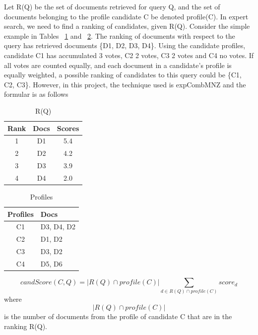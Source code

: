 Let R(Q) be the set of documents retrieved for query Q, and the set of documents belonging to the profile candidate C be denoted profile(C). In expert
search, we need to find a ranking of candidates, given R(Q). Consider the simple example in Tables ~\ref{table:ranking} and ~\ref{table:profiles}.
The ranking of documents with respect to the query has retrieved documents \{D1, D2, D3, D4\}. Using the candidate profiles, candidate C1 has accumulated
3 votes, C2 2 votes, C3 2 votes and C4 no votes. If all votes are counted equally, and each document in a candidate's profile is equally weighted, a possible
ranking of candidates to this query could be \{C1, C2, C3\}. However, in this project, the technique used is expCombMNZ and the formular is as follows

\begin{table}
\centering
\begin{tabular}{|c|c|c|}
\hline \textbf{Rank} & \textbf{Docs} & \textbf{Scores}\\
\hline 1 & D1 & 5.4 \\
\hline 2 & D2 & 4.2\\
\hline 3 & D3 & 3.9 \\
\hline 4 & D4 & 2.0 \\  
\hline
\end{tabular}
\caption{R(Q)} \label{table:ranking}
\end{table}
\quad
\begin{table}
\centering
\begin{tabular}{|c|l|}
\hline \textbf{Profiles} & \textbf{Docs}\\
\hline C1 & D3, D4, D2 \\
\hline C2 & D1, D2 \\
\hline C3 & D3, D2 \\
\hline C4 & D5, D6 \\  
\hline
\end{tabular}
\caption{Profiles} \label{table:profiles}
\end{table}

\[
candScore(C,Q) = |R(Q) \cap profile(C)| \sum_{d \in R(Q) \cap profile(C)} score_d
\]
where \[|R(Q) \cap profile(C)|\] is the number of documents from the profile of candidate C that are in the ranking R(Q).














